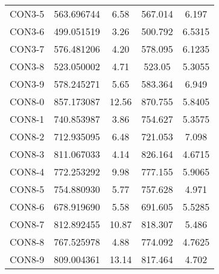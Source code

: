 \begin{table}[ht]
\begin{tabular}{c c c c c}
CON3-5 & 563.696744 & 6.58 & 567.014 & 6.197 \\
CON3-6 & 499.051519 & 3.26 & 500.792 & 6.5315 \\
CON3-7 & 576.481206 & 4.20 & 578.095 & 6.1235 \\
CON3-8 & 523.050002 & 4.71 & 523.05 & 5.3055 \\
CON3-9 & 578.245271 & 5.65 & 583.364 & 6.949 \\
CON8-0 & 857.173087 & 12.56 & 870.755 & 5.8405 \\
CON8-1 & 740.853987 & 3.86 & 754.627 & 5.3575 \\
CON8-2 & 712.935095 & 6.48 & 721.053 & 7.098 \\
CON8-3 & 811.067033 & 4.14 & 826.164 & 4.6715 \\
CON8-4 & 772.253292 & 9.98 & 777.155 & 5.9065 \\
CON8-5 & 754.880930 & 5.77 & 757.628 & 4.971 \\
CON8-6 & 678.919690 & 5.58 & 691.605 & 5.5285 \\
CON8-7 & 812.892455 & 10.87 & 818.307 & 5.486 \\
CON8-8 & 767.525978 & 4.88 & 774.092 & 4.7625 \\
CON8-9 & 809.004361 & 13.14 & 817.464 & 4.702 \\
[1ex]\hline
\end{tabular}
\label{table:nonlin}
\end{table} \clearpage
